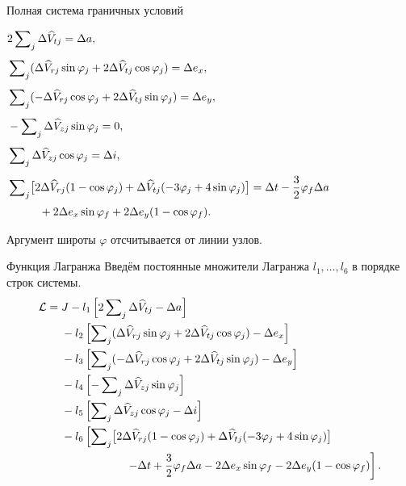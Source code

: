 \documentclass[11pt,aspectratio=169,t]{beamer}
\newcommand{\eqcompact}{\fontsize{10}{12}\selectfont}
\begin{document}
\begin{frame}{Полная система граничных условий}
\relax
\derivationmathspacing
{\eqcompact\derivationmathspacing
\centering\(\displaystyle
\begin{aligned}[t]
 &2\sum\nolimits_j\Delta\widehat V_{tj}=\Delta a,\\[4pt]
 &\sum\nolimits_j(\Delta\widehat V_{rj}\sin\varphi_j+
              2\Delta\widehat V_{tj}\cos\varphi_j)=\Delta e_x,\\[4pt]
 &\sum\nolimits_j(-\Delta\widehat V_{rj}\cos\varphi_j+
              2\Delta\widehat V_{tj}\sin\varphi_j)=\Delta e_y,\\[4pt]
 &-\sum\nolimits_j\Delta\widehat V_{zj}\sin\varphi_j=0,\\[4pt]
 &\sum\nolimits_j\Delta\widehat V_{zj}\cos\varphi_j=\Delta i,\\[4pt]
 &\sum\nolimits_j\bigl[2\Delta\widehat V_{rj}(1-\cos\varphi_j)
       +\Delta\widehat V_{tj}(-3\varphi_j+4\sin\varphi_j)\bigr]
       =\Delta t-\frac32\varphi_f\Delta a\\[2pt]
 &\hspace{10mm}+2\Delta e_x\sin\varphi_f
                   +2\Delta e_y(1-\cos\varphi_f).
\end{aligned}
\)\par}
\medskip
\justifying
Аргумент широты $\varphi$ отсчитывается от линии узлов.
\end{frame}

\begin{frame}{Функция Лагранжа}
\relax
\derivationmathspacing
\justifying
Введём постоянные множители Лагранжа $l_1,\ldots,l_6$
в порядке строк системы.
{\eqcompact\derivationmathspacing
\setlength{\jot}{1pt}
\[
\begin{aligned}
 \mathcal L={}&J-l_1\left[2\sum\nolimits_j\Delta\widehat V_{tj}-\Delta a\right]\\
 &-l_2\left[\sum\nolimits_j(\Delta\widehat V_{rj}\sin\varphi_j+
                    2\Delta\widehat V_{tj}\cos\varphi_j)-\Delta e_x\right]\\
 &-l_3\left[\sum\nolimits_j(-\Delta\widehat V_{rj}\cos\varphi_j+
                    2\Delta\widehat V_{tj}\sin\varphi_j)-\Delta e_y\right]\\
 &-l_4\left[-\sum\nolimits_j\Delta\widehat V_{zj}\sin\varphi_j\right]\\
 &-l_5\left[\sum\nolimits_j\Delta\widehat V_{zj}\cos\varphi_j
                    -\Delta i\right]\\
 &-l_6\left[\sum\nolimits_j\bigl[2\Delta\widehat V_{rj}(1-\cos\varphi_j)
       +\Delta\widehat V_{tj}(-3\varphi_j+4\sin\varphi_j)\bigr]\right.\\
 &\hspace{20mm}\left.-\Delta t+\frac32\varphi_f\Delta a
         -2\Delta e_x\sin\varphi_f-2\Delta e_y(1-\cos\varphi_f)\right].
\end{aligned}
\]
}
\end{frame}
\end{document}
